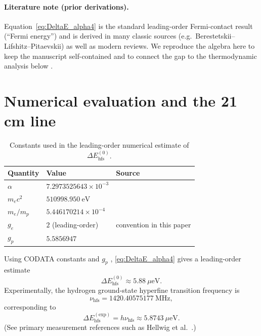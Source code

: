 \documentclass[11pt,a4paper]{article}
\begin{document}
        \paragraph{Literature note (prior derivations).}
            Equation~\eqref{eq:DeltaE_alpha4} is the standard leading-order Fermi-contact result (``Fermi energy'')
            and is derived in many classic sources (e.g.\ Berestetskii--Lifshitz--Pitaevskii) as well as modern reviews.
            We reproduce the algebra here to keep the manuscript self-contained and to connect the gap to the thermodynamic
            analysis below \cite{BLP_QED1982,Karshenboim2002}.

    \section{Numerical evaluation and the 21 cm line}
    \label{sec:numerics}
    
    \begin{table}[t]
        \centering
        \caption{Constants used in the leading-order numerical estimate of $\Delta E_{\mathrm{hfs}}^{(0)}$.}
        \label{tab:constants}
        \begin{tabular}{lll}
            \toprule
            Quantity & Value & Source \\
            \midrule
            $\alpha$ & $7.2973525643\times 10^{-3}$ & \cite{CODATA2022} \\
            $m_e c^2$ & $510998.950~\mathrm{eV}$ & \cite{CODATA2022} \\
            $m_e/m_p$ & $5.446170214\times 10^{-4}$ & \cite{CODATA2022} \\
            $g_e$ & $2$ (leading-order) & convention in this paper \\
            $g_p$ & $5.5856947$ & \cite{CODATA2022} \\
            \bottomrule
        \end{tabular}
    \end{table}
    
    Using CODATA constants and $g_p$ \cite{CODATA2022}, \eqref{eq:DeltaE_alpha4} gives a leading-order estimate
    \begin{equation}
        \Delta E_{\mathrm{hfs}}^{(0)} \approx 5.88~\mu\mathrm{eV}.
    \end{equation}
    Experimentally, the hydrogen ground-state hyperfine transition frequency is
    \begin{equation}
        \nu_{\mathrm{hfs}} = 1420.40575177~\mathrm{MHz},
    \end{equation}
    corresponding to
    \begin{equation}
        \Delta E_{\mathrm{hfs}}^{\mathrm{(exp)}} = h\nu_{\mathrm{hfs}} \approx 5.8743~\mu\mathrm{eV}.
        \label{eq:DeltaE_exp}
    \end{equation}
    (See primary measurement references such as Hellwig et al.\ \cite{Hellwig1970}.)
    
\end{document}
